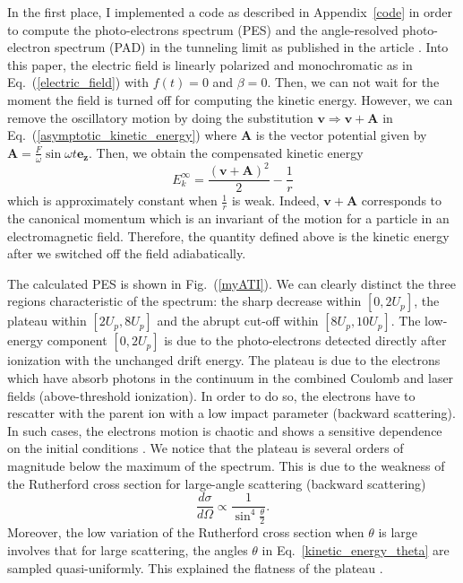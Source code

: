 \documentclass[a4paper]{article}
\begin{document}
In the first place, I implemented a code as described in Appendix~\ref{code} in order to compute the photo-electrons spectrum (PES) and the angle-resolved photo-electron spectrum (PAD) in the tunneling limit as published in the article \cite{Hu_1997}. Into this paper, the electric field is linearly polarized and monochromatic as in Eq.~(\ref{electric_field}) with $f(t)=0$ and $\beta=0$. Then, we can not wait for the moment the field is turned off for computing the kinetic energy. However, we can remove the oscillatory motion by doing the substitution $\mathbf{v}\Rightarrow\mathbf{v}+\mathbf{A}$ in Eq.~(\ref{asymptotic_kinetic_energy}) where $\mathbf{A}$ is the vector potential given by $\mathbf{A}=\tfrac{F}{\omega}\sin{\omega t}\mathbf{e_{z}}$. Then, we obtain the compensated kinetic energy
\begin{equation}
E_{k}^{\infty}=\frac{(\mathbf{v}+\mathbf{A})^{2}}{2}-\frac{1}{r}
\end{equation}
which is approximately constant when $\frac{1}{r}$ is weak. Indeed, $\mathbf{v}+\mathbf{A}$ corresponds to the canonical momentum which is an invariant of the motion for a particle in an electromagnetic field. Therefore, the quantity defined above is the kinetic energy after we switched off the field adiabatically.
\par 
The calculated PES is shown in Fig.~(\ref{myATI}). We can clearly distinct the three regions characteristic of the spectrum: the sharp decrease within $[0, 2U_{p}]$, the plateau within $[2U_{p}, 8U_{p}]$ and the abrupt cut-off within $[8U_{p}, 10U_{p}]$. The low-energy component $[0, 2U_{p}]$ is due to the photo-electrons detected directly after ionization with the unchanged drift energy. The plateau is due to the electrons which have absorb photons in the continuum in the combined Coulomb and laser fields (above-threshold ionization). In order to do so, the electrons have to rescatter with the parent ion with a low impact parameter (backward scattering). In such cases, the electrons motion is chaotic and shows a sensitive dependence on the initial conditions \cite{Hu_1997}. We notice that the plateau is several orders of magnitude below the maximum of the spectrum. This is due to the weakness of the Rutherford cross section for large-angle scattering (backward scattering)
\begin{equation}
\frac{d\sigma}{d\Omega} \propto \frac{1}{\sin^{4}{\frac{\theta}{2}}}.
\end{equation}
Moreover, the low variation of the Rutherford cross section when $\theta$ is large involves that for large scattering, the angles $\theta$ in Eq.~\eqref{kinetic_energy_theta} are sampled quasi-uniformly. This explained the flatness of the plateau \cite{Walker_1996}.
\end{document}
